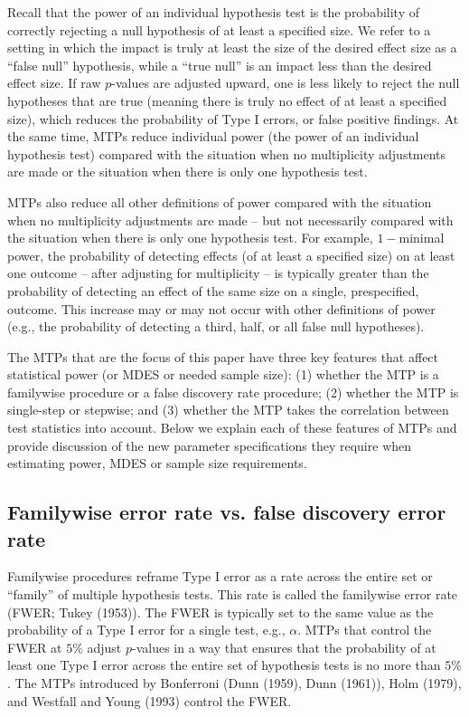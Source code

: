 \documentclass[
]{article}
\begin{document}
Recall that the power of an individual hypothesis test is the
probability of correctly rejecting a null hypothesis of at least a
specified size. We refer to a setting in which the impact is truly at
least the size of the desired effect size as a ``false null''
hypothesis, while a ``true null'' is an impact less than the desired
effect size. If raw \(p\)-values are adjusted upward, one is less likely
to reject the null hypotheses that are true (meaning there is truly no
effect of at least a specified size), which reduces the probability of
Type I errors, or false positive findings. At the same time, MTPs reduce
individual power (the power of an individual hypothesis test) compared
with the situation when no multiplicity adjustments are made or the
situation when there is only one hypothesis test.

MTPs also reduce all other definitions of power compared with the
situation when no multiplicity adjustments are made -- but not
necessarily compared with the situation when there is only one
hypothesis test. For example, \(1-\)minimal power, the probability of
detecting effects (of at least a specified size) on at least one outcome
-- after adjusting for multiplicity -- is typically greater than the
probability of detecting an effect of the same size on a single,
prespecified, outcome. This increase may or may not occur with other
definitions of power (e.g., the probability of detecting a third, half,
or all false null hypotheses).

The MTPs that are the focus of this paper have three key features that
affect statistical power (or MDES or needed sample size): (1) whether
the MTP is a familywise procedure or a false discovery rate procedure;
(2) whether the MTP is single-step or stepwise; and (3) whether the MTP
takes the correlation between test statistics into account. Below we
explain each of these features of MTPs and provide discussion of the new
parameter specifications they require when estimating power, MDES or
sample size requirements.

\subsection{Familywise error rate vs. false discovery error rate}

Familywise procedures reframe Type I error as a rate across the entire
set or ``family'' of multiple hypothesis tests. This rate is called the
familywise error rate (FWER; Tukey (1953)). The FWER is typically set to
the same value as the probability of a Type I error for a single test,
e.g., \(\alpha\). MTPs that control the FWER at \(5\%\) adjust
\(p\)-values in a way that ensures that the probability of at least one
Type I error across the entire set of hypothesis tests is no more than
\(5\%\). The MTPs introduced by Bonferroni (Dunn (1959), Dunn (1961)),
Holm (1979), and Westfall and Young (1993) control the FWER.
\end{document}
